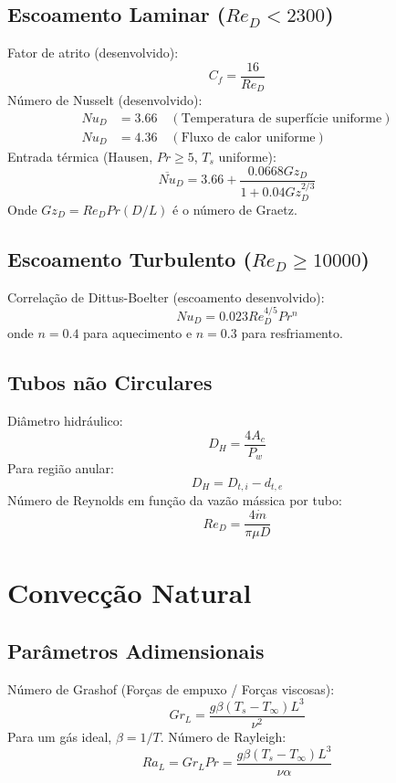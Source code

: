 \documentclass[12pt, a4paper]{article}
\begin{document}
\subsection{Escoamento Laminar ($Re_D < 2300$)}
Fator de atrito (desenvolvido):
\begin{equation}
    C_f = \frac{16}{Re_D}
\end{equation}
Número de Nusselt (desenvolvido):
\begin{align*}
    Nu_D &= 3.66 \quad (\text{Temperatura de superfície uniforme}) \\
    Nu_D &= 4.36 \quad (\text{Fluxo de calor uniforme})
\end{align*}
Entrada térmica (Hausen, $Pr \ge 5$, $T_s$ uniforme):
\begin{equation}
    \overline{Nu}_D = 3.66 + \frac{0.0668 Gz_D}{1+0.04 Gz_D^{2/3}}
\end{equation}
Onde $Gz_D = Re_D Pr (D/L)$ é o número de Graetz.

\subsection{Escoamento Turbulento ($Re_D \ge 10000$)}
Correlação de Dittus-Boelter (escoamento desenvolvido):
\begin{equation}
    Nu_D = 0.023 Re_D^{4/5} Pr^n
\end{equation}
onde $n=0.4$ para aquecimento e $n=0.3$ para resfriamento.

\subsection{Tubos não Circulares}
Diâmetro hidráulico:
\begin{equation}
    D_H = \frac{4 A_c}{P_w}
\end{equation}
Para região anular:
\begin{equation}
    D_H = D_{t,i} - d_{t,e}
\end{equation}
Número de Reynolds em função da vazão mássica por tubo:
\begin{equation}
    Re_D = \frac{4 \dot{m}}{\pi \mu D}
\end{equation}

\newpage

\section{Convecção Natural}

\subsection{Parâmetros Adimensionais}
Número de Grashof (Forças de empuxo / Forças viscosas):
\begin{equation}
    Gr_L = \frac{g \beta (T_s - T_\infty) L^3}{\nu^2}
\end{equation}
Para um gás ideal, $\beta = 1/T$.
Número de Rayleigh:
\begin{equation}
    Ra_L = Gr_L Pr = \frac{g \beta (T_s - T_\infty) L^3}{\nu \alpha}
\end{equation}
\end{document}
